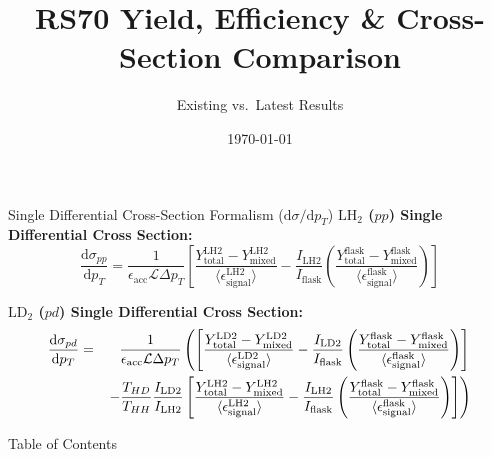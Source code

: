 \documentclass[aspectratio=169, 10pt]{beamer}
\title[RS70 XSec Comparison]{RS70 Yield, Efficiency \& Cross-Section Comparison}
\subtitle{Existing vs.\ Latest Results}
\date{\today}
\providecommand{\diffd}{\mathrm{d}}
\begin{document}
\begin{frame}
    \titlepage
\end{frame}

\begin{frame}{Single Differential Cross-Section Formalism ($\diffd\sigma / \diffd p_T$)}
    \textbf{$\text{LH}_2$ ($pp$) Single Differential Cross Section:}
    \begin{equation}
        \frac{\diffd\sigma_{pp}}{\diffd p_{T}} = \frac{1}{\epsilon_{\text{acc}} \mathcal{L} \Delta p_{T}} 
        \left[ 
            \frac{Y^{\text{LH2}}_{\text{total}} - Y^{\text{LH2}}_{\text{mixed}}}{\langle\epsilon^{\text{LH2}}_{\text{signal}}\rangle} 
- \frac{I_{\text{LH2}}}{I_{\text{flask}}} 
            \left( \frac{Y^{\text{flask}}_{\text{total}} - Y^{\text{flask}}_{\text{mixed}}}{\langle\epsilon^{\text{flask}}_{\text{signal}}\rangle} \right)
        \right]
        \label{eq:modified_cross_section_pt}
    \end{equation}

    \vspace{0.3em}
    \textbf{$\text{LD}_2$ ($pd$) Single Differential Cross Section:}
    {\small
    \begin{eqnarray}
        \frac{\diffd\sigma_{pd}}{\diffd p_{T}} &=& \frac{1}{\epsilon_{\text{acc}} \mathcal{L} \Delta p_{T}} 
        \left(
        \left[ 
            \frac{Y^{\text{LD2}}_{\text{total}} - Y^{\text{LD2}}_{\text{mixed}}}{\langle\epsilon^{\text{LD2}}_{\text{signal}}\rangle} 
- \frac{I_{\text{LD2}}}{I_{\text{flask}}} 
            \left( \frac{Y^{\text{flask}}_{\text{total}} - Y^{\text{flask}}_{\text{mixed}}}{\langle\epsilon^{\text{flask}}_{\text{signal}}\rangle} \right)
        \right] \right. \nonumber \\
        & & \left. - \frac{T_{HD}}{T_{HH}} \frac{I_{\rm LD2}}{I_{\rm LH2}}\left[ 
            \frac{Y^{\text{LH2}}_{\text{total}} - Y^{\text{LH2}}_{\text{mixed}}}{\langle\epsilon^{\text{LH2}}_{\text{signal}}\rangle} 
- \frac{I_{\text{LH2}}}{I_{\text{flask}}} 
            \left( \frac{Y^{\text{flask}}_{\text{total}} - Y^{\text{flask}}_{\text{mixed}}}{\langle\epsilon^{\text{flask}}_{\text{signal}}\rangle} \right)
        \right]
        \right)
        \label{eq:modified_cross_section_pd_pt}
    \end{eqnarray}
    }
\end{frame}

\begin{frame}{Table of Contents}
    \tableofcontents
\end{frame}
\end{document}
